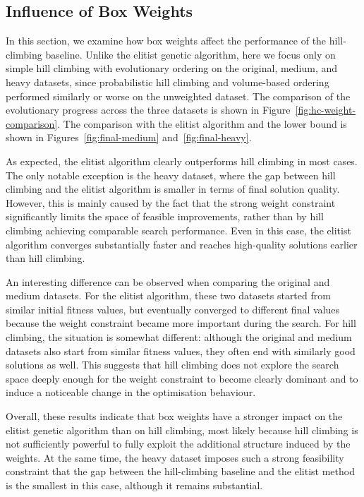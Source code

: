 \subsection{Influence of Box Weights}

In this section, we examine how box weights affect the performance of the hill-climbing baseline. 
Unlike the elitist genetic algorithm, here we focus only on simple hill climbing with evolutionary ordering on the original, medium, and heavy datasets, since probabilistic hill climbing and volume-based ordering performed similarly or worse on the unweighted dataset. 
The comparison of the evolutionary progress across the three datasets is shown in Figure~\ref{fig:hc-weight-comparison}.
The comparison with the elitist algorithm and the lower bound is shown in Figures~\ref{fig:final-medium} and~\ref{fig:final-heavy}.

As expected, the elitist algorithm clearly outperforms hill climbing in most cases. 
The only notable exception is the heavy dataset, where the gap between hill climbing and the elitist algorithm is smaller in terms of final solution quality. 
However, this is mainly caused by the fact that the strong weight constraint significantly limits the space of feasible improvements, rather than by hill climbing achieving comparable search performance. 
Even in this case, the elitist algorithm converges substantially faster and reaches high-quality solutions earlier than hill climbing.

An interesting difference can be observed when comparing the original and medium datasets. 
For the elitist algorithm, these two datasets started from similar initial fitness values, but eventually converged to different final values because the weight constraint became more important during the search. 
For hill climbing, the situation is somewhat different: although the original and medium datasets also start from similar fitness values, they often end with similarly good solutions as well. 
This suggests that hill climbing does not explore the search space deeply enough for the weight constraint to become clearly dominant and to induce a noticeable change in the optimisation behaviour.

Overall, these results indicate that box weights have a stronger impact on the elitist genetic algorithm than on hill climbing, 
most likely because hill climbing is not sufficiently powerful to fully exploit the additional structure induced by the weights. 
At the same time, the heavy dataset imposes such a strong feasibility constraint that the gap between the hill-climbing baseline and the elitist method is the smallest in this case, although it remains substantial.

